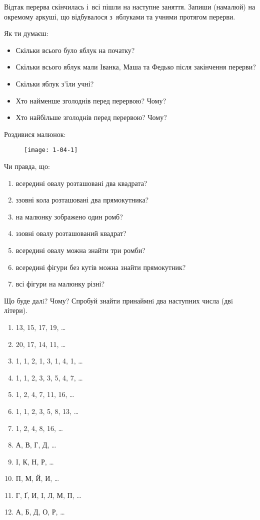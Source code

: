 Відтак перерва скінчилась і~всі пішли на наступне заняття.
Запиши (намалюй) на окремому аркуші, що відбувалося з~яблуками
та учнями протягом перерви.

Як ти думаєш:
\begin{itemize}
    \item Скільки всього було яблук на початку?
    \item Скільки всього яблук мали Іванка, Маша та Федько
    після закінчення перерви?
    \item Скільки яблук з'їли учні?
    \item Хто найменше зголоднів перед перервою? Чому?
    \item Хто найбільше зголоднів перед перервою? Чому?
\end{itemize}


\problem
Роздивися малюнок:

\begin{figure}[h]
    \centering
    \texttt{[image: 1-04-1]}
\end{figure}

Чи правда, що:
\begin{enumerate}
    \item всередині овалу розташовані два квадрата?
    \item ззовні кола розташовані два прямокутника?
    \item на малюнку зображено один ромб?
    \item ззовні овалу розташований квадрат?
    \item всередині овалу можна знайти три ромби?
    \item всередині фігури без кутів можна знайти прямокутник?
    \item всі фігури на малюнку різні?
\end{enumerate}



\problem
Що буде далi? Чому?
Спробуй знайти принаймнi два наступних числа (двi літери).
\begin{enumerate}
    \item 13, 15, 17, 19, \ldots
    \item 20, 17, 14, 11, \ldots
    \item 1, 1, 2, 1, 3, 1, 4, 1, \ldots
    \item 1, 1, 2, 3, 3, 5, 4, 7, \ldots
    \item 1, 2, 4, 7, 11, 16, \ldots
    \item 1, 1, 2, 3, 5, 8, 13, \ldots
    \item 1, 2, 4, 8, 16, \ldots
    \item А, В, Г, Д, \ldots  %
    \item I, К, Н, Р, \ldots
    \item П, М, Й, И, \ldots
    \item Г, Ґ, И, I, Л, М, П, \ldots  %
    \item А, Б, Д, О, Р, \ldots  %
\end{enumerate}


